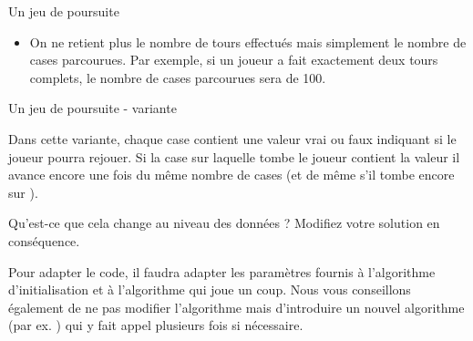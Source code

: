 \begin{Exercice}{Un jeu de poursuite}
\begin{enumerate}
		\begin{itemize}
		\item
			On ne retient plus le nombre de tours effectués
			mais simplement le nombre de cases parcourues.
			Par exemple, si un joueur a fait exactement deux tours complets,
			le nombre de cases parcourues sera de 100.
			\begin{algo}
			\end{algo}
		\end{itemize}
	\end{enumerate}
	
\end{Exercice}

\begin{Exercice}{Un jeu de poursuite - variante}

	Dans cette variante,
	chaque case contient une valeur vrai ou faux
	indiquant si le joueur pourra rejouer.
	Si la case sur laquelle tombe le joueur contient la valeur
	 il avance encore une fois du même nombre de cases 
	(et de même s’il tombe encore sur ).
	
	Qu'est-ce que cela change au niveau des données ?
	Modifiez votre solution en conséquence.
	
	Pour adapter le code,
	il faudra adapter les paramètres fournis à l'algorithme d'initialisation
	et à l'algorithme qui joue un coup.
	Nous vous conseillons également de ne pas modifier l'algorithme  
	mais d'introduire un nouvel algorithme (par ex. ) 
	qui y fait appel plusieurs fois si nécessaire.
\end{Exercice}

